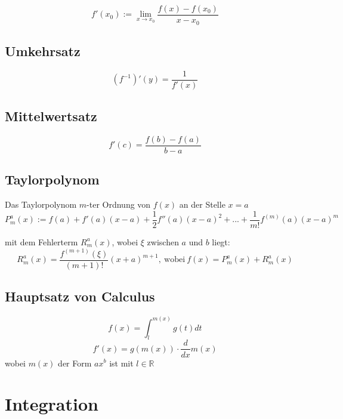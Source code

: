 \documentclass[11pt]{article}
\begin{document}
\begin{equation*}
	f'(x_0) := \lim_{x\to x_0}\frac{f(x) - f(x_0)}{x-x_0}
\end{equation*}

\subsection{Umkehrsatz}

\begin{equation*}
	(f^{-1})'(y) = \frac{1}{f'(x)}
\end{equation*}

\subsection{Mittelwertsatz}

\begin{equation*}
	f'(c) = \frac{f(b) - f(a)}{b - a}
\end{equation*}

\subsection{Taylorpolynom}

Das Taylorpolynom $m$-ter Ordnung von $f(x)$ an der Stelle $x=a$
\begin{equation*}
	P^a_m(x) := f(a) + f'(a)(x-a) + \frac{1}{2}f''(a)(x-a)^2 + ... + \frac{1}{m!} f^{(m)}(a)(x-a)^m
\end{equation*}

mit dem Fehlerterm $R^a_m(x)$, wobei $\xi$ zwischen $a$ und $b$ liegt:
\begin{equation*}
	R^a_m(x) = \frac{f^{(m+1)}(\xi)}{(m+1)!}(x+a)^{m+1},\ \text{wobei}\ f(x) = P^a_m(x) + R^a_m(x)
\end{equation*}

\subsection{Hauptsatz von Calculus}
\begin{equation*}
	f(x)=\int^{m(x)}_lg(t)dt
\end{equation*}
\begin{equation*}
	f'(x)=g(m(x))\cdot\frac{d}{dx}m(x)
\end{equation*}
wobei $m(x)$ der Form $ax^b$ ist mit $l\in \mathbb{R}$

\section{Integration}
\end{document}
